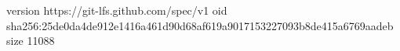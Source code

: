 version https://git-lfs.github.com/spec/v1
oid sha256:25de0da4de912e1416a461d90d68af619a9017153227093b8de415a6769aadeb
size 11088
